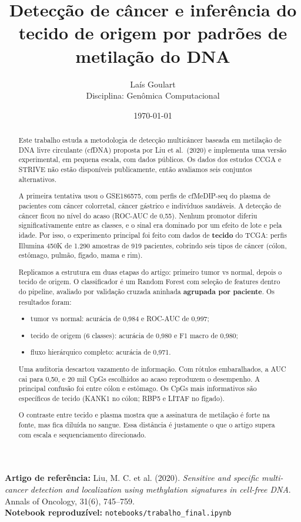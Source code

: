 \documentclass[11pt,a4paper]{article}
\title{Detecção de câncer e inferência do tecido de origem por padrões de metilação do DNA}
\author{Laís Goulart\\[2pt]\small Disciplina: Genômica Computacional}
\date{\today}
\providecommand{\tightlist}{\setlength{\itemsep}{0pt}\setlength{\parskip}{0pt}}
\begin{document}
\maketitle

\noindent\textbf{Artigo de referência:} Liu, M. C. et al. (2020). \emph{Sensitive and specific multi-cancer detection and localization using methylation signatures in cell-free DNA}. Annals of Oncology, 31(6), 745--759.\\
\textbf{Notebook reproduzível:} \texttt{notebooks/trabalho\_final.ipynb}

\begin{abstract}

Este trabalho estuda a metodologia de detecção multicâncer baseada em metilação
de DNA livre circulante (cfDNA) proposta por Liu et al.~(2020) e implementa uma
versão experimental, em pequena escala, com dados públicos. Os dados dos estudos
CCGA e STRIVE não estão disponíveis publicamente, então avaliamos seis conjuntos
alternativos.

A primeira tentativa usou o GSE186575, com perfis de cfMeDIP-seq do plasma de
pacientes com câncer colorretal, câncer gástrico e indivíduos saudáveis. A
detecção de câncer ficou no nível do acaso (ROC-AUC de 0,55). Nenhum promotor
diferiu significativamente entre as classes, e o sinal era dominado por um
efeito de lote e pela idade. Por isso, o experimento principal foi feito com
dados de \textbf{tecido} do TCGA: perfis Illumina 450K de 1.290 amostras de 919
pacientes, cobrindo seis tipos de câncer (cólon, estômago, pulmão, fígado, mama
e rim).

Replicamos a estrutura em duas etapas do artigo: primeiro tumor vs normal,
depois o tecido de origem. O classificador é um Random Forest com seleção de
features dentro do pipeline, avaliado por validação cruzada aninhada
\textbf{agrupada por paciente}. Os resultados foram:

\begin{itemize}
\tightlist
\item
  tumor vs normal: acurácia de 0,984 e ROC-AUC de 0,997;
\item
  tecido de origem (6 classes): acurácia de 0,980 e F1 macro de 0,980;
\item
  fluxo hierárquico completo: acurácia de 0,971.
\end{itemize}

Uma auditoria descartou vazamento de informação. Com rótulos embaralhados, a AUC
cai para 0,50, e 20 mil CpGs escolhidos ao acaso reproduzem o desempenho. A
principal confusão foi entre cólon e estômago. Os CpGs mais informativos são
específicos de tecido (KANK1 no cólon; RBP5 e LITAF no fígado).

O contraste entre tecido e plasma mostra que a assinatura de metilação é forte
na fonte, mas fica diluída no sangue. Essa distância é justamente o que o artigo
supera com escala e sequenciamento direcionado.

\end{abstract}
\end{document}
